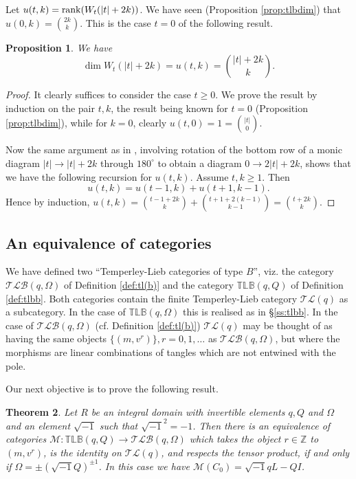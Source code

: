 \documentclass[12pt]{amsart}
\newtheorem{theorem}{Theorem}[section]
\newtheorem{proposition}[theorem]{Proposition}
\theoremstyle{definition}
\theoremstyle{remark}
\numberwithin{equation}{section}
\newcommand{\mc}{\mathcal}
\newcommand{\Z}{{\mathbb Z}}
\newcommand{\CM}{{\mathcal M}}
\newcommand{\be}{\begin{equation}}
\newcommand{\ee}{\end{equation}}
\newcommand{\cM}{\mc M}
\newcommand{\is}{\sqrt{-1}}
\newcommand{\lr}{\longrightarrow}
\newcommand{\rank}{{\rm{rank}}}
\newcommand{\tl}{Temperley-Lieb }
\newcommand{\TLC}{\mathcal{TL}}
\newcommand{\TLBB}{{\mathbb{TLB}}}
\newcommand{\TLBC}{\mathcal{TLB}}
\begin{document}
Let $u(t,k)=\rank(W_t(|t|+2k))$. We have seen (Proposition \ref{prop:tlbdim}) that $u(0,k)=\binom{2k}{k}$. This is the case $t=0$
of the following result.

\begin{proposition}\label{prop:dimwt}
We have 
\[
\dim W_t(|t|+2k)=u(t,k)=\binom{|t|+2k}{k}.
\]
\end{proposition}
\begin{proof}
It clearly suffices to consider the case $t\geq 0$. We prove the result by induction on the pair $t,k$, 
the result being known for $t=0$ (Proposition \ref{prop:tlbdim}), while for $k=0$, clearly $u(t,0)=1=\binom{|t|}{0}$. 

Now the same argument
as in \cite[Prop. 5.2]{ILZ1}, involving rotation of the bottom row of a monic diagram $|t|\lr |t|+2k$ through $180^\circ$
to obtain a diagram $0\lr 2|t|+2k$, shows that we have the following recursion for $u(t,k)$. Assume $t,k\geq 1$. Then
\be\label{eq:urec}
u(t,k)=u(t-1,k)+u(t+1, k-1).
\ee
Hence by induction, $u(t,k)=\binom{t-1+2k}{k}+\binom{t+1+2(k-1)}{k-1}=\binom{t+2k}{k}$.
\end{proof}



\subsection{An equivalence of categories} We have defined two ``Temperley-Lieb categories of type $B$'', viz. the category 
$\TLBC(q,\Omega)$ of Definition \ref{def:tl(b)} and the category $\TLBB(q,Q)$ of Definition \ref{def:tlbb}. 
Both categories contain the finite \tl category $\TLC(q)$ as a subcategory. In the case of $\TLBB(q,\Omega)$ this is realised as in 
\S\ref{ss:tlbb}. In the case of $\TLBC(q,\Omega)$ (cf. Definition \ref{def:tl(b)}) $\TLC(q)$ may be thought of as having the 
same objects $\{(m,v^r)\}, r=0,1,\dots$ as $\TLBC(q,\Omega)$, but where the morphisms are linear combinations of tangles which are
not entwined with the pole.

Our next objective is to prove the following result.

\begin{theorem}\label{thm:tlbequ}
Let $R$ be an integral domain with invertible elements $q,Q$ and $\Omega$ and an element $\sqrt{-1}$ such that
$\is^2=-1$. Then there is an equivalence of categories $\CM:\TLBB(q,Q)\lr \TLBC(q,\Omega)$ which takes 
the object $r\in\Z$ to $(m,v^r)$, is the identity on $\TLC(q)$, and respects the tensor product, if and only if 
$\Omega=\pm (\is Q)^{\pm 1}$. In this case we have $\cM(C_0)=\sqrt{-1}qL-QI$.
\end{theorem}
\end{document}
